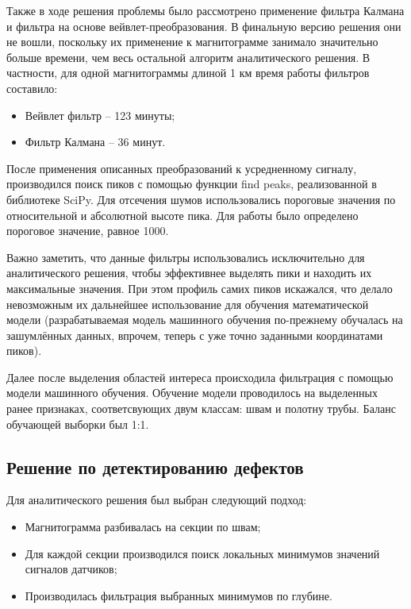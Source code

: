 \documentclass[a4paper,article,14pt]{extarticle}
\begin{document}
Также в ходе решения проблемы было рассмотрено применение фильтра Калмана и фильтра на основе вейвлет-преобразования. 
В финальную версию решения они не вошли, поскольку их применение к магнитограмме занимало значительно больше времени, 
чем весь остальной алгоритм аналитического решения. В частности, для одной магнитограммы длиной 1 км время работы 
фильтров составило:

\begin{itemize}
    \item Вейвлет фильтр – 123 минуты;
    \item Фильтр Калмана – 36 минут.
\end{itemize}

После применения описанных преобразований к усредненному сигналу, производился поиск пиков с помощью функции 
find peaks, реализованной в библиотеке SciPy. Для отсечения шумов использовались пороговые значения 
по относительной и абсолютной высоте пика. Для работы было определено пороговое значение, равное 1000.

Важно заметить, что данные фильтры использовались исключительно для аналитического решения, чтобы эффективнее 
выделять пики и находить их максимальные значения. При этом профиль самих пиков искажался, что делало невозможным 
их дальнейшее использование для обучения математической модели (разрабатываемая модель машинного обучения по-прежнему 
обучалась на зашумлённых данных, впрочем, теперь с уже точно заданными координатами пиков).

Далее после выделения областей интереса происходила фильтрация с помощью модели машинного обучения. 
Обучение модели проводилось на выделенных ранее признаках, соответсвующих двум классам: швам и полотну трубы. 
Баланс обучающей выборки был 1:1. 

\subsection{Решение по детектированию дефектов}

Для аналитического решения был выбран следующий подход:

\begin{itemize}
    \item Магнитограмма разбивалась на секции по швам;
    \item Для каждой секции производился поиск локальных минимумов значений сигналов датчиков;
    \item Производилась фильтрация выбранных минимумов по глубине.
\end{itemize}
\end{document}
